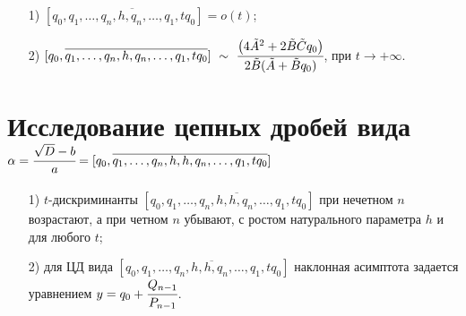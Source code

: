 \begin{corollaryr}
\begin{enumerate}
\item[1) ]$[{q_0},\overline{{q_1},\dots,{q_n},{h},{q_n},\dots,{q_1},t{q_0}}]=o(t)$;
\item[2) ]$[{q_0},\overline{{q_1},\dots,{q_n},{h},{q_n},\dots,{q_1},t{q_0}}] \ \sim \ {\cfrac{\bigl(4\tilde{A}^{2}+2\tilde{B}\tilde{C}q_{0}\bigr)}{2\tilde{B}(\tilde{A}+\tilde{B}q_{0})}}$, при ${t\to +\infty}$.
\end{enumerate}
\end{corollaryr}


\section{Исследование цепных дробей вида
\newline$\alpha=\cfrac {\sqrt{D}-b}a=[{q_0},\overline{{q_1},\dots,{q_n},{h},{h},{q_n},\dots,{q_1},t{q_0}}]$}

\begin{theoremr}\label{PiskunovaTretyakov:th:5}
\begin{enumerate}
\item[1) ]$t$-дискриминанты $[{q_0},\overline{{q_1},\dots,{q_n},{h},{h},{q_n},\dots,{q_1},t{q_0}}]$ при нечетном $n$ возрастают, а при четном $n$ убывают, с ростом натурального параметра $h$ и для любого $t$;
\item[2) ]для ЦД вида $[{q_0},\overline{{q_1},\dots,{q_n},{h},{h},{q_n},\dots,{q_1},t{q_0}}]$ наклонная асимптота задается уравнением $y={q_0}+\cfrac {Q_{n-1}}{P_{n-1}}$.
\end{enumerate}
\end{theoremr}


